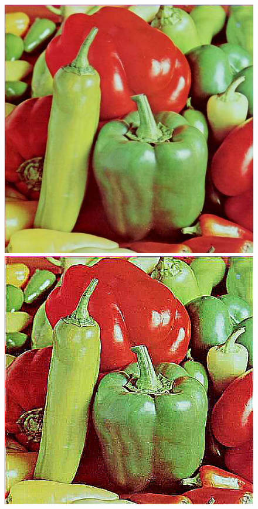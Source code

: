 \documentclass{article}
\begin{document}
\begin{figure}[!htb]
\centering
\includegraphics[scale=0.2]{img/peppers_24bit.png}
\includegraphics[scale=0.2]{img/_Filtr_Gornoprzepustowy_peppers_24bit.png}\\ 

\end{figure}
\end{document}
